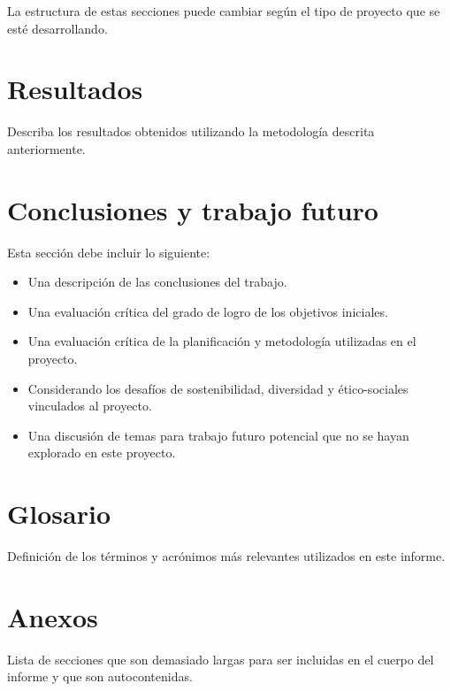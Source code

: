 \documentclass[12pt,a4paper,twoside]{book}
\begin{document}
La estructura de estas secciones puede cambiar según el tipo de proyecto que se esté desarrollando.

\section{Resultados}

Describa los resultados obtenidos utilizando la metodología descrita anteriormente.

\section{Conclusiones y trabajo futuro}

Esta sección debe incluir lo siguiente:

\begin{itemize}
    \item Una descripción de las conclusiones del trabajo.
    \item Una evaluación crítica del grado de logro de los objetivos iniciales.
    \item Una evaluación crítica de la planificación y metodología utilizadas en el proyecto.
    \item Considerando los desafíos de sostenibilidad, diversidad y ético-sociales vinculados al proyecto.
    \item Una discusión de temas para trabajo futuro potencial que no se hayan explorado en este proyecto.
\end{itemize}

\section{Glosario}

Definición de los términos y acrónimos más relevantes utilizados en este informe.

\nocite{*}



\section{Anexos}

Lista de secciones que son demasiado largas para ser incluidas en el cuerpo del informe y que son autocontenidas.
\end{document}
